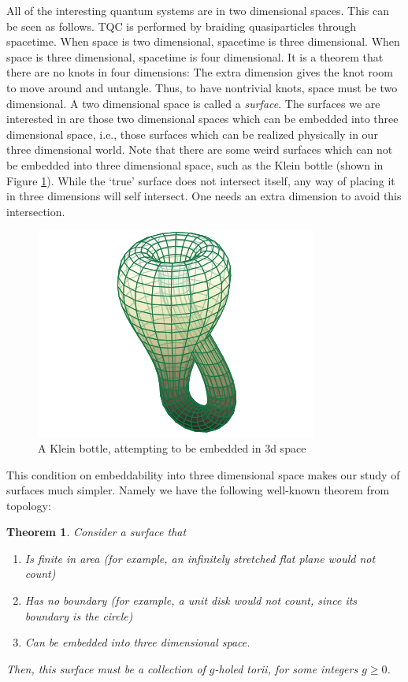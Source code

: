 \documentclass{article}
\newtheorem{theorem}{Theorem}[section]
\theoremstyle{definition}
\numberwithin{figure}{section}
\begin{document}
All of the interesting quantum systems are in two dimensional spaces. This can be seen as follows. TQC is performed by braiding quasiparticles through spacetime. When space is two dimensional, spacetime is three dimensional. When space is three dimensional, spacetime is four dimensional. It is a theorem that there are no knots in four dimensions: The extra dimension gives the knot room to move around and untangle. Thus, to have nontrivial knots, space must be two dimensional. A two dimensional space is called a \textit{surface}. The surfaces we are interested in are those two dimensional spaces which can be embedded into three dimensional space, i.e., those surfaces which can be realized physically in our three dimensional world. Note that there are some weird surfaces which can not be embedded into three dimensional space, such as the Klein bottle (shown in Figure  \ref{fig:klein-bottle}). While the `true' surface does not intersect itself, any way of placing it in three dimensions will self intersect. One needs an extra dimension to avoid this intersection.

\begin{figure}
\begin{center}
\includegraphics[scale=0.25]{klein-bottle}
\caption{A Klein bottle, attempting to be embedded in 3d space}
\label{fig:klein-bottle}
\end{center}
\end{figure}

This condition on embeddability into three dimensional space makes our study of surfaces much simpler. Namely we have the following well-known theorem from topology:

\begin{theorem} Consider a surface that

\begin{enumerate}
\item Is finite in area (for example, an infinitely stretched flat plane would not count)
\item Has no boundary (for example, a unit disk would not count, since its boundary is the circle)
\item  Can be embedded into three dimensional space.
\end{enumerate}

Then, this surface must be a collection of $g$-holed torii, for some integers $g\geq 0$.
\end{theorem}
\end{document}
